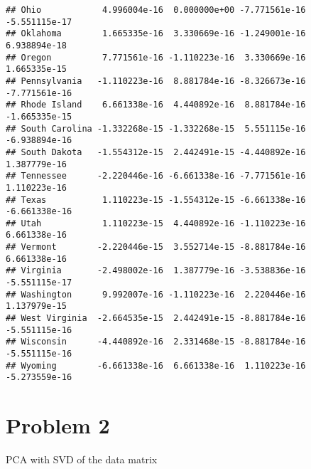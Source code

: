 \documentclass[]{article}
\newenvironment{Shaded}{\begin{snugshade}}{\end{snugshade}}
\newcommand{\KeywordTok}[1]{\textcolor[rgb]{0.13,0.29,0.53}{\textbf{#1}}}
\newcommand{\DataTypeTok}[1]{\textcolor[rgb]{0.13,0.29,0.53}{#1}}
\newcommand{\StringTok}[1]{\textcolor[rgb]{0.31,0.60,0.02}{#1}}
\newcommand{\CommentTok}[1]{\textcolor[rgb]{0.56,0.35,0.01}{\textit{#1}}}
\newcommand{\OperatorTok}[1]{\textcolor[rgb]{0.81,0.36,0.00}{\textbf{#1}}}
\newcommand{\NormalTok}[1]{#1}
\begin{document}
\begin{verbatim}
## Ohio            4.996004e-16  0.000000e+00 -7.771561e-16 -5.551115e-17
## Oklahoma        1.665335e-16  3.330669e-16 -1.249001e-16  6.938894e-18
## Oregon          7.771561e-16 -1.110223e-16  3.330669e-16  1.665335e-15
## Pennsylvania   -1.110223e-16  8.881784e-16 -8.326673e-16 -7.771561e-16
## Rhode Island    6.661338e-16  4.440892e-16  8.881784e-16 -1.665335e-15
## South Carolina -1.332268e-15 -1.332268e-15  5.551115e-16 -6.938894e-16
## South Dakota   -1.554312e-15  2.442491e-15 -4.440892e-16  1.387779e-16
## Tennessee      -2.220446e-16 -6.661338e-16 -7.771561e-16  1.110223e-16
## Texas           1.110223e-15 -1.554312e-15 -6.661338e-16 -6.661338e-16
## Utah            1.110223e-15  4.440892e-16 -1.110223e-16  6.661338e-16
## Vermont        -2.220446e-15  3.552714e-15 -8.881784e-16  6.661338e-16
## Virginia       -2.498002e-16  1.387779e-16 -3.538836e-16 -5.551115e-17
## Washington      9.992007e-16 -1.110223e-16  2.220446e-16  1.137979e-15
## West Virginia  -2.664535e-15  2.442491e-15 -8.881784e-16 -5.551115e-16
## Wisconsin      -4.440892e-16  2.331468e-15 -8.881784e-16 -5.551115e-16
## Wyoming        -6.661338e-16  6.661338e-16  1.110223e-16 -5.273559e-16
\end{verbatim}

\section*{Problem 2}

PCA with SVD of the data matrix

\begin{Shaded}
\end{Shaded}
\end{document}
